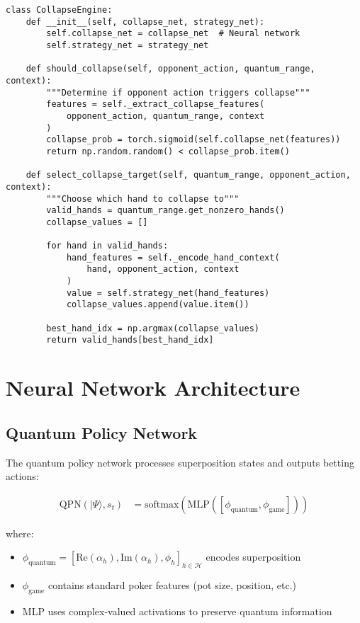 \documentclass[11pt,a4paper]{article}
\begin{document}
\begin{lstlisting}
class CollapseEngine:
    def __init__(self, collapse_net, strategy_net):
        self.collapse_net = collapse_net  # Neural network
        self.strategy_net = strategy_net
        
    def should_collapse(self, opponent_action, quantum_range, context):
        """Determine if opponent action triggers collapse"""
        features = self._extract_collapse_features(
            opponent_action, quantum_range, context
        )
        collapse_prob = torch.sigmoid(self.collapse_net(features))
        return np.random.random() < collapse_prob.item()
        
    def select_collapse_target(self, quantum_range, opponent_action, context):
        """Choose which hand to collapse to"""
        valid_hands = quantum_range.get_nonzero_hands()
        collapse_values = []
        
        for hand in valid_hands:
            hand_features = self._encode_hand_context(
                hand, opponent_action, context
            )
            value = self.strategy_net(hand_features)
            collapse_values.append(value.item())
            
        best_hand_idx = np.argmax(collapse_values)
        return valid_hands[best_hand_idx]
\end{lstlisting}

\section{Neural Network Architecture}

\subsection{Quantum Policy Network}

The quantum policy network processes superposition states and outputs betting actions:

\begin{align}
\text{QPN}(|\Psi\rangle, s_t) &= \text{softmax}(\text{MLP}([\phi_{\text{quantum}}, \phi_{\text{game}}]))
\end{align}

where:
\begin{itemize}
\item $\phi_{\text{quantum}} = [\text{Re}(\alpha_h), \text{Im}(\alpha_h), \phi_h]_{h \in \mathcal{H}}$ encodes superposition
\item $\phi_{\text{game}}$ contains standard poker features (pot size, position, etc.)
\item MLP uses complex-valued activations to preserve quantum information
\end{itemize}
\end{document}
